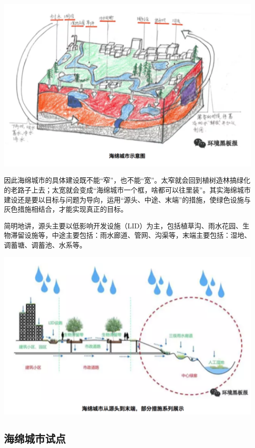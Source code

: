 \documentclass[
]{book}
\begin{document}
\includegraphics[width=6.67in]{images/ch3}

因此海绵城市的具体建设既不能``窄''，也不能``宽''。太窄就会回到植树造林搞绿化的老路子上去；太宽就会变成``海绵城市一个框，啥都可以往里装''。其实海绵城市建设还是要以目标与问题为导向，运用``源头、中途、末端''的措施，使绿色设施与灰色措施相结合，才能实现真正的目标。

简明地讲，源头主要以低影响开发设施（LID）为主，包括植草沟、雨水花园、生物滞留设施等，中途主要包括：雨水廊道、管网、沟渠等，末端主要包括：湿地、调蓄塘、调蓄池、水系等。

\includegraphics[width=6.67in]{images/ch4}

\hypertarget{ux6d77ux7ef5ux57ceux5e02ux8bd5ux70b9}{%
\subsection{海绵城市试点}\label{ux6d77ux7ef5ux57ceux5e02ux8bd5ux70b9}}
\end{document}
